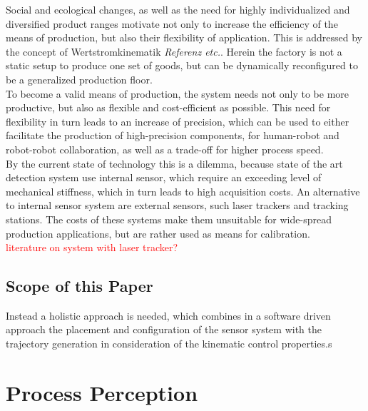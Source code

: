 \documentclass[5p,times,procedia]{elsarticle}
\begin{document}
Social and ecological changes, as well as the need for
highly individualized and diversified product ranges
motivate not only to increase the efficiency of the means
of production, but also their flexibility of application.
This is addressed by the concept of Wertstromkinematik \textit{Referenz etc.}.
Herein the factory is not a static setup to produce
one set of goods, but can be dynamically reconfigured to be a generalized production floor.\\
To become a valid means of production, the system needs not only to
be more productive, but also as flexible and cost-efficient as possible. This need for flexibility in turn leads to an increase of precision, which can be used to either facilitate the production of high-precision components, for human-robot and robot-robot collaboration, as well as a trade-off for higher process speed.\\
By the current state of technology this is a dilemma, because state of the art detection system use internal sensor, which require an exceeding level of mechanical stiffness, which in turn leads to high
acquisition costs. An alternative to internal sensor system are external sensors, such laser trackers and tracking stations. The costs of these systems make them unsuitable for wide-spread production applications, but are rather used as means for calibration.\\

\textcolor{red}{literature on system with laser tracker? }%

\subsection{Scope of this Paper}

Instead a holistic approach is needed, which combines in a software driven approach the placement and configuration of the sensor system with the trajectory generation in consideration of the kinematic control properties.s

\lipsum[1-1]


\section{Process Perception}
\end{document}
